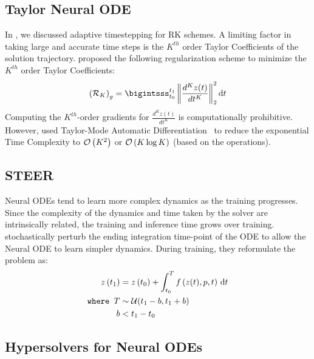 \subsection{Taylor Neural ODE}
\label{subsec:taylor_neural_odes}

In , we discussed adaptive timestepping for RK schemes. A limiting factor in taking large and accurate time steps is the $K^{th}$ order Taylor Coefficients of the solution trajectory. \citet{kelly2020learning} proposed the following regularization scheme to minimize the $K^{th}$ order Taylor Coefficients:
%
\begin{equation}
  \left(\mathcal{R}_{K}\right)_g = \bigintsss_{t_0}^{t_1} \left\|\frac{d^K z(t)}{dt^K}\right\|_2^2 \dt
\end{equation}
%
Computing the $K^{th}$-order gradients for $\frac{d^K z(t)}{dt^K}$ is computationally prohibitive. However, \citet{kelly2020learning} used Taylor-Mode Automatic Differentiation~\citep{griewank2008evaluating, bettencourt2019taylor} to reduce the exponential Time Complexity to $\mathcal{O}\left(K^2\right)$ or $\mathcal{O}\left(K \log{K}\right)$ (based on the operations).

\subsection{STEER}
\label{subsec:steer}

Neural ODEs tend to learn more complex dynamics as the training progresses. Since the complexity of the dynamics and time taken by the solver are intrinsically related, the training and inference time grows over training. \citet{ghosh2020steer} stochastically perturb the ending integration time-point of the ODE to allow the Neural ODE to learn simpler dynamics. During training, they reformulate the problem as:
%
\begin{align}
  z\left(t_1\right)      & = z\left(t_0\right) + \int_{t_0}^{T} f\left(z(t), p, t\right) \, \mathrm{d}t \\
  \texttt{where } T  & \sim \mathcal{U}(t_1 - b, t_1 + b)                           \\
  \phantom{where } b & < t_1 - t_0
\end{align}
%

\subsection{Hypersolvers for Neural ODEs}
\label{subsec:hypersolvers_for_neural_odes}

